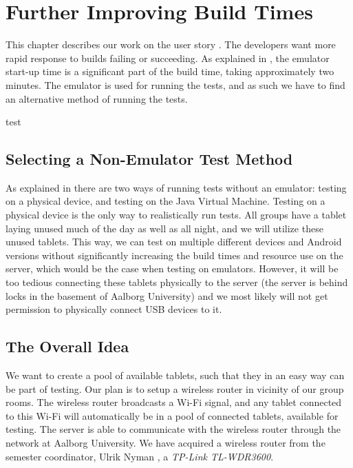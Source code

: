 \chapter{Further Improving Build Times}
This chapter describes our work on the user story . The developers want more rapid response to builds failing or succeeding. As explained in , the emulator start-up time is a significant part of the build time, taking approximately two minutes. The emulator is used for running the tests, and as such we have to find an alternative method of running the tests.

\begin{chapterorganization}
  \item test
\end{chapterorganization}

\section{Selecting a Non-Emulator Test Method}
As explained in  there are two ways of running tests without an emulator: testing on a physical device, and testing on the Java Virtual Machine. Testing on a physical device is the only way to realistically run tests. All groups have a tablet laying unused much of the day as well as all night, and we will utilize these unused tablets. This way, we can test on multiple different devices and Android versions without significantly increasing the build times and resource use on the server, which would be the case when testing on emulators. However, it will be too tedious connecting these tablets physically to the server (the server is behind locks in the basement of Aalborg University) and we most likely will not get permission to physically connect USB devices to it.

\section{The Overall Idea}
We want to create a pool of available tablets, such that they in an easy way can be part of testing. Our plan is to setup a wireless router in vicinity of our group rooms. The wireless router broadcasts a Wi-Fi signal, and any tablet connected to this Wi-Fi will automatically be in a pool of connected tablets, available for testing. The server is able to communicate with the wireless router through the network at Aalborg University. We have acquired a wireless router from the semester coordinator, Ulrik Nyman , a \emph{TP-Link TL-WDR3600}.

